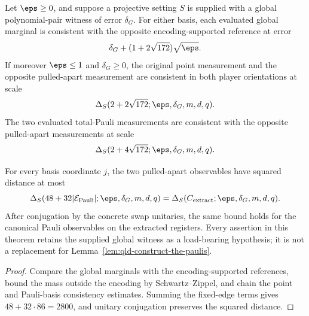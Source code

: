 \begin{theorem}
\label{thm:qld-supplied-global-consistency-explicit}
\leanok
{}
Let $\eps\geq0$, and suppose a projective setting $S$ is supplied with a global
polynomial-pair witness of error $\delta_G$.  For either basis, each evaluated
global marginal is consistent with the opposite encoding-supported reference
at error
\[
 \delta_G+(1+2\sqrt{172})\sqrt\eps.
\]
If moreover $\eps\leq1$ and $\delta_G\geq0$, the original point measurement
and the opposite pulled-apart measurement are consistent in both player
orientations at scale
\[
 \Delta_S(2+2\sqrt{172};\eps,\delta_G,m,d,q).
\]
The two evaluated total-Pauli measurements are consistent with the opposite
pulled-apart measurements at scale
\[
 \Delta_S(2+4\sqrt{172};\eps,\delta_G,m,d,q).
\]

For every basis coordinate $j$, the two pulled-apart observables have squared
distance at most
\[
 \Delta_S(48+32\lvert\mathcal E_{\mathrm{Pauli}}\rvert;
   \eps,\delta_G,m,d,q)
 =\Delta_S(C_{\mathrm{extract}};\eps,\delta_G,m,d,q).
\]
After conjugation by the concrete swap unitaries, the same bound holds for the
canonical Pauli observables on the extracted registers.  Every assertion in
this theorem retains the supplied global witness as a load-bearing hypothesis;
it is not a replacement for Lemma~\ref{lem:qld-construct-the-paulis}.
\end{theorem}
\begin{proof}
Compare the global marginals with the encoding-supported references, bound
the mass outside the encoding by Schwartz--Zippel, and chain the point and
Pauli-basis consistency estimates.  Summing the fixed-edge terms gives
$48+32\cdot86=2800$, and unitary conjugation preserves the squared distance.
\end{proof}

